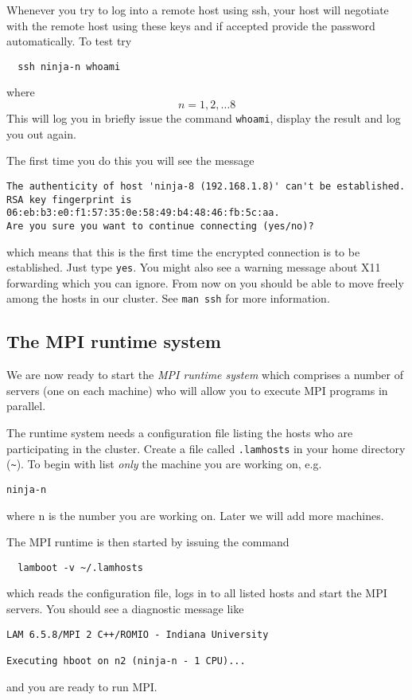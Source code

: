 Whenever you try to log into a remote host using ssh, your host will 
negotiate with the remote host using these keys and if accepted provide
the password automatically. To test try
\begin{verbatim}
  ssh ninja-n whoami
\end{verbatim}
where 
\[
  n = 1, 2, \ldots 8
\]
This will log you in briefly issue the command \texttt{whoami},
display the result and log you out again.

The first time you do this you will see the message
\begin{verbatim}
The authenticity of host 'ninja-8 (192.168.1.8)' can't be established.
RSA key fingerprint is 06:eb:b3:e0:f1:57:35:0e:58:49:b4:48:46:fb:5c:aa.
Are you sure you want to continue connecting (yes/no)?
\end{verbatim}
which means that this is the first time the encrypted connection 
is to be established. Just type \texttt{yes}.
You might also see a warning message about X11 forwarding which 
you can ignore. From now on you should be able to move freely among 
the hosts in our cluster.
See \texttt{man ssh} for more information.

\subsection*{The MPI runtime system}

We are now ready to start the \emph{MPI runtime system} which comprises a
number of servers (one on each machine) who will allow you to execute
MPI programs in parallel.

The runtime system needs a configuration file listing 
the hosts who are participating in the cluster.
Create a file called \texttt{.lamhosts} in your 
home directory (\verb+~+). 
To begin with list \emph{only} the machine you are working on, e.g.
\begin{verbatim}
ninja-n
\end{verbatim} 
where n is the number you are working on.
Later we will add more machines.

The MPI runtime is then started by issuing the command
\begin{verbatim}
  lamboot -v ~/.lamhosts
\end{verbatim}
which reads the configuration file, logs in to all listed hosts and 
start the MPI servers.  
You should see a diagnostic message like
\begin{verbatim}
LAM 6.5.8/MPI 2 C++/ROMIO - Indiana University

Executing hboot on n2 (ninja-n - 1 CPU)...
\end{verbatim}
and you are ready to run MPI.

        

